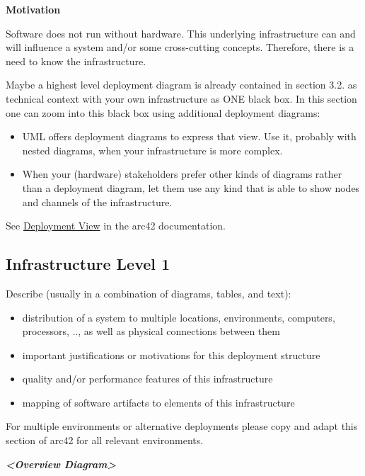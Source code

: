 \documentclass[
]{article}
\begin{document}
\textbf{Motivation}

Software does not run without hardware. This underlying infrastructure
can and will influence a system and/or some cross-cutting concepts.
Therefore, there is a need to know the infrastructure.

Maybe a highest level deployment diagram is already contained in section
3.2. as technical context with your own infrastructure as ONE black box.
In this section one can zoom into this black box using additional
deployment diagrams:

\begin{itemize}
\item
  UML offers deployment diagrams to express that view. Use it, probably
  with nested diagrams, when your infrastructure is more complex.
\item
  When your (hardware) stakeholders prefer other kinds of diagrams
  rather than a deployment diagram, let them use any kind that is able
  to show nodes and channels of the infrastructure.
\end{itemize}

See \href{https://docs.arc42.org/section-7/}{Deployment View} in the
arc42 documentation.

\hypertarget{_infrastructure_level_1}{%
\subsection{Infrastructure Level 1}\label{_infrastructure_level_1}}

Describe (usually in a combination of diagrams, tables, and text):

\begin{itemize}
\item
  distribution of a system to multiple locations, environments,
  computers, processors, .., as well as physical connections between
  them
\item
  important justifications or motivations for this deployment structure
\item
  quality and/or performance features of this infrastructure
\item
  mapping of software artifacts to elements of this infrastructure
\end{itemize}

For multiple environments or alternative deployments please copy and
adapt this section of arc42 for all relevant environments.

\emph{\textbf{\textless Overview Diagram\textgreater{}}}
\end{document}
